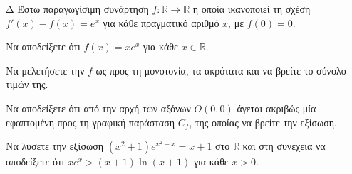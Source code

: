 \begin{thema}{Δ}
Έστω παραγωγίσιμη συνάρτηση $f:\mathbb{R} \to \mathbb{R}$ η οποία ικανοποιεί τη σχέση $f'(x) - f(x) = e^x$ για κάθε πραγματικό αριθμό $x$, με $f(0)=0$.
\begin{erwthma}
    \item Να αποδείξετε ότι $f(x) = x e^x$ για κάθε $x \in \mathbb{R}$.
    \item Να μελετήσετε την $f$ ως προς τη μονοτονία, τα ακρότατα και να βρείτε το σύνολο τιμών της.
    \item Να αποδείξετε ότι από την αρχή των αξόνων $O(0,0)$ άγεται ακριβώς μία εφαπτομένη προς τη γραφική παράσταση $C_f$, της οποίας να βρείτε την εξίσωση.
    \item Να λύσετε την εξίσωση $\displaystyle (x^2+1) e^{x^2-x} = x+1$ στο $\mathbb{R}$ και στη συνέχεια να αποδείξετε ότι $x e^x > (x+1)\ln(x+1)$ για κάθε $x>0$.
\end{erwthma}
\end{thema}
